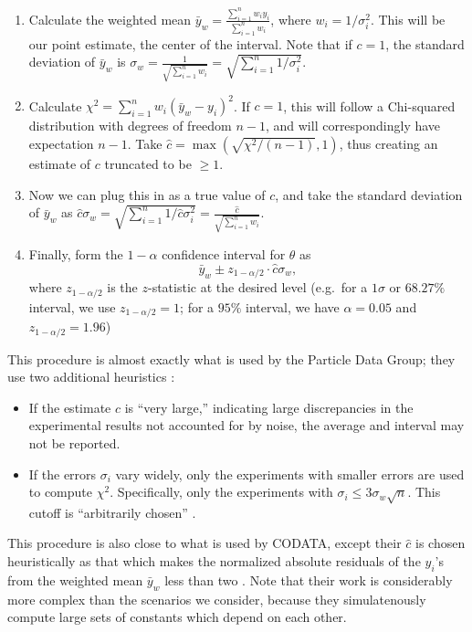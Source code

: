 \documentclass[12pt]{article}
\begin{document}
\begin{enumerate}
\item
  Calculate the weighted mean $\bar{y}_w=\frac{\sum_{i=1}^n w_iy_i}{\sum_{i=1}^nw_i}$, where $w_i=1/\sigma_i^2$. This will be our point estimate, the center of the interval. Note that if $c=1$, the standard deviation of $\bar{y}_w$ is $\sigma_w=\frac{1}{\sqrt{\sum_{i=1}^nw_i}}=\sqrt{\sum_{i=1}^n1/\sigma_i^2}$.
\item
  Calculate $\chi^2=\sum_{i=1}^n w_i(\bar{y}_w-y_i)^2$. If $c=1$, this will follow a Chi-squared distribution with degrees of freedom $n-1$, and will correspondingly have expectation $n-1$. Take $\hat c=\max(\sqrt{\chi^2/(n-1)},1)$, thus creating an estimate of $c$ truncated to be $\geq 1$.
\item
  Now we can plug this in as a true value of $c$, and take the standard deviation of $\bar{y}_w$ as $\hat c\sigma_w=\sqrt{\sum_{i=1}^n1/\hat c\sigma_i^2}=\frac{\hat c}{\sqrt{\sum_{i=1}^nw_i}}$.
\item
  Finally, form the $1-\alpha$ confidence interval for $\theta$ as \[\bar{y}_w\pm z_{1-{\alpha/2}}\cdot \hat c\sigma_w,\] where $z_{1-\alpha/2}$ is the $z$-statistic at the desired level (e.g.~for a $1\sigma$ or $68.27\%$ interval, we use $z_{1-\alpha/2}=1$; for a $95\%$ interval, we have $\alpha=0.05$ and $z_{1-\alpha/2}=1.96$)
\end{enumerate}

This procedure is almost exactly what is used by the Particle Data Group; they use two additional heuristics \citep[Section 5.2.2]{navas2024review}:

\begin{itemize}

\item
  If the estimate $\hat c$ is ``very large,'' indicating large discrepancies in the experimental results not accounted for by noise, the average and interval may not be reported.
\item
  If the errors $\sigma_i$ vary widely, only the experiments with smaller errors are used to compute $\chi^2$. Specifically, only the experiments with $\sigma_i\leq 3\sigma_w\sqrt{n}$. This cutoff is ``arbitrarily chosen'' \citep[Section 5.2.2]{navas2024review}.
\end{itemize}

This procedure is also close to what is used by CODATA, except their $\hat c$ is chosen heuristically as that which makes the normalized absolute residuals of the $y_i$'s from the weighted mean $\bar y_w$ less than two \citep{tiesinga2021codata}. Note that their work is considerably more complex than the scenarios we consider, because they simulatenously compute large sets of constants which depend on each other.
\end{document}
